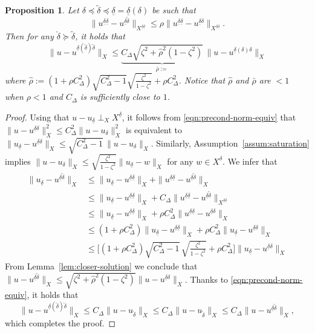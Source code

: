\documentclass[11pt,a4paper,oneside,english]{amsart}
\numberwithin{equation}{section}
\numberwithin{theorem}{section}
\newtheorem{prop}[theorem]{Proposition}
\theoremstyle{definition}
\newcommand{\udelta}{{\underline{\delta}}}
\newcommand{\jw}[1]{{\color{red}{JW: #1}}}
\begin{document}
\begin{prop}
  \label{prop:construct-improved-solution}
  Let $\delta \preceq \tilde{\delta} \preceq \udelta=\udelta(\delta)$ be such that
  \begin{equation}
    \|u^{\udelta \udelta}-u^{\udelta \tilde{\delta}}\|_{X^{\udelta \udelta}} \leq \rho\|u^{\udelta \udelta}-u^{\udelta \delta}\|_{X^{\udelta \udelta}}.
    \label{eqn:construct-improved-solution}
  \end{equation}
  Then for any $\check{\delta} \succeq \tilde{\delta}$, it holds that
  \[
    \|u-u^{\udelta(\check{\delta}) \check{\delta}}\|_X \leq
    \underbrace{C_\Delta \sqrt{\zeta^2+\hat{\rho}^2(1-\zeta^2)}}_{\bar{\rho}:=}\,\|u-u^{\udelta(\delta) \delta}\|_X
  \]
  where $\hat{\rho}:=(1+\rho C_\Delta^2)\sqrt{C_\Delta^2-1}\sqrt{\frac{\zeta^2}{1-\zeta^2}}+\rho C_\Delta^2$.
  Notice that $\hat{\rho}$ and $\bar{\rho}$ are $<1$ when $\rho<1$ and $C_\Delta$ is sufficiently close to $1$.\jw{oef alle diacritics duizelen me hier}
\end{prop}
\begin{proof}
  Using that $u-u_\udelta \perp_X X^\udelta$, it follows from \eqref{eqn:precond-norm-equiv} that 
  $\|u-u^{\udelta \delta}\|_X^2 \leq C_\Delta^2 \|u-u_\delta\|_X^2$ is equivalent to
  $\|u_\udelta-u^{\udelta \delta}\|_X \leq \sqrt{C_\Delta^2 -1}\, \|u-u_{\delta}\|_X$.
  Similarly, Assumption~\ref{assum:saturation} implies $\|u-u_\delta\|_X \leq \sqrt{\frac{\zeta^2}{1-\zeta^2}} \|u_\udelta-w\|_X$ for any $w \in X^\delta$.
  We infer that
  \begin{align*}
    \|u_\udelta-u^{\udelta \tilde{\delta}}\|_X &\leq \|u_\udelta-u^{\udelta \udelta}\|_X+\|u^{\udelta \udelta}-u^{\udelta \tilde{\delta}}\|_X\\
    &\leq \|u_\udelta-u^{\udelta \udelta}\|_X+C_\Delta\|u^{\udelta \udelta}-u^{\udelta \tilde{\delta}}\|_{X^{\udelta \udelta}}\\
    &\leq \|u_\udelta-u^{\udelta \udelta}\|_X+\rho C_\Delta^2  \|u^{\udelta \udelta}-u^{\udelta \delta}\|_{X}\\
    &\leq (1+\rho C_\Delta^2) \|u_\udelta-u^{\udelta \udelta}\|_X+\rho C_\Delta^2  \|u_\udelta-u^{\udelta \delta}\|_{X}\\
    &\leq \Big[{\textstyle (1+\rho C_\Delta^2)\sqrt{C_\Delta^2-1}\,\sqrt{\frac{\zeta^2}{1-\zeta^2}}+\rho C_\Delta^2} \Big]\|u_\udelta-u^{\udelta \delta}\|_{X}
  \end{align*}
  From Lemma~\ref{lem:closer-solution} we conclude that
  $\|u-u^{\udelta \tilde{\delta}}\|_X \leq \sqrt{\zeta^2+\hat{\rho}^2(1-\zeta^2)} \|u-u^{\udelta \delta}\|_{X}$.
  Thanks to \eqref{eqn:precond-norm-equiv}, it holds that
  \[
    \|u-u^{\udelta(\check{\delta}) \check{\delta}}\|_X
    \leq C_\Delta \|u-u_{\check{\delta}}\|_X
    \leq C_\Delta \|u-u_{\tilde{\delta}}\|_X
    \leq C_\Delta \|u-u^{\udelta \tilde{\delta}}\|_X,
  \]
  which completes the proof.\jw{deze proof heb ik niet gecontroleerd}
\end{proof}
\end{document}
